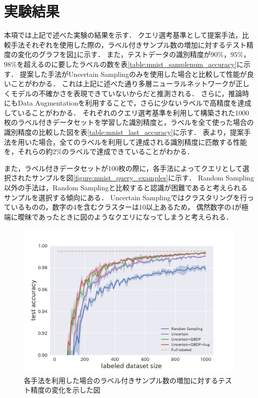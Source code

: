 \section{実験結果}
本項では上記で述べた実験の結果を示す．
クエリ選考基準として提案手法，比較手法それぞれを使用した際の，ラベル付きサンプル数の増加に対するテスト精度の変化のグラフを図\ref{fig:mnist_acc_graph}に示す．
また，テストデータの識別精度が$90\%$，$95\%$，$98\%$を超えるのに要したラベルの数を表\ref{table:mnist_samplenum_accuracy}に示す．
提案した手法がUncertain Samplingのみを使用した場合と比較して性能が良いことがわかる．
これは上記に述べた通り多層ニューラルネットワークが正しくモデルの不確かさを表現できていないからだと推測される．
さらに，推論時にもData Augmentationを利用することで，さらに少ないラベルで高精度を達成していることがわかる．
それぞれのクエリ選考基準を利用して構築された1000枚のラベル付きデータセットを学習した識別精度と，ラベルを全て使った場合の識別精度の比較した図を表\ref{table:mnist_last_accuracy}に示す．
表より，提案手法を用いた場合，全てのラベルを利用して達成される識別精度に匹敵する性能を，それらの約$2\%$のラベルで達成できていることがわかる．

また，ラベル付きデータセットが100枚の際に，各手法によってクエリとして選択されたサンプルを図\ref{figure:mnist_query_examples}に示す．
Random Sampling以外の手法は，Random Samplingと比較すると認識が困難であると考えられるサンプルを選択する傾向にある．
Uncertain Samplingではクラスタリングを行っているものの，数字の4を含むクラスターは10以上あるため，
偶然数字の4が極端に曖昧であったときに図のようなクエリになってしまうと考えられる．


\begin{figure}[h]
     \begin{center}
      \includegraphics[width=12cm]{figures/mnist_acc_graph.pdf}
     \end{center}
    \caption{\label{fig:mnist_acc_graph}各手法を利用した場合のラベル付きサンプル数の増加に対するテスト精度の変化を示した図}
\end{figure}

